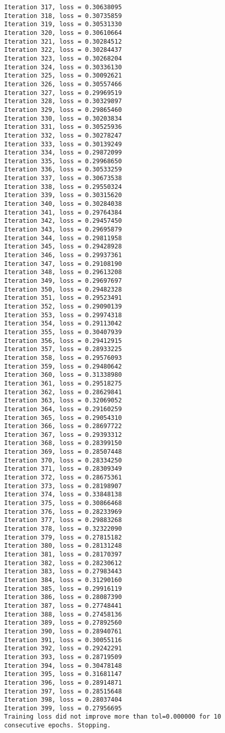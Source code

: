 \documentclass[11pt]{article}
\begin{document}
\begin{Verbatim}[commandchars=\\\{\}]
Iteration 317, loss = 0.30638095
Iteration 318, loss = 0.30735859
Iteration 319, loss = 0.30531330
Iteration 320, loss = 0.30610664
Iteration 321, loss = 0.30284512
Iteration 322, loss = 0.30284437
Iteration 323, loss = 0.30268204
Iteration 324, loss = 0.30336130
Iteration 325, loss = 0.30092621
Iteration 326, loss = 0.30557466
Iteration 327, loss = 0.29969519
Iteration 328, loss = 0.30329897
Iteration 329, loss = 0.29865460
Iteration 330, loss = 0.30203834
Iteration 331, loss = 0.30525936
Iteration 332, loss = 0.30278247
Iteration 333, loss = 0.30139249
Iteration 334, loss = 0.29872099
Iteration 335, loss = 0.29968650
Iteration 336, loss = 0.30533259
Iteration 337, loss = 0.30673538
Iteration 338, loss = 0.29550324
Iteration 339, loss = 0.30315620
Iteration 340, loss = 0.30284038
Iteration 341, loss = 0.29764384
Iteration 342, loss = 0.29457450
Iteration 343, loss = 0.29695879
Iteration 344, loss = 0.29811958
Iteration 345, loss = 0.29428928
Iteration 346, loss = 0.29937361
Iteration 347, loss = 0.29108190
Iteration 348, loss = 0.29613208
Iteration 349, loss = 0.29697697
Iteration 350, loss = 0.29482328
Iteration 351, loss = 0.29523491
Iteration 352, loss = 0.29090139
Iteration 353, loss = 0.29974318
Iteration 354, loss = 0.29113042
Iteration 355, loss = 0.30407939
Iteration 356, loss = 0.29412915
Iteration 357, loss = 0.28933225
Iteration 358, loss = 0.29576093
Iteration 359, loss = 0.29480642
Iteration 360, loss = 0.31338980
Iteration 361, loss = 0.29518275
Iteration 362, loss = 0.28629841
Iteration 363, loss = 0.32069052
Iteration 364, loss = 0.29160259
Iteration 365, loss = 0.29054310
Iteration 366, loss = 0.28697722
Iteration 367, loss = 0.29393312
Iteration 368, loss = 0.28399150
Iteration 369, loss = 0.28507448
Iteration 370, loss = 0.28334250
Iteration 371, loss = 0.28309349
Iteration 372, loss = 0.28675361
Iteration 373, loss = 0.28198907
Iteration 374, loss = 0.33848138
Iteration 375, loss = 0.30866468
Iteration 376, loss = 0.28233969
Iteration 377, loss = 0.29883268
Iteration 378, loss = 0.32322090
Iteration 379, loss = 0.27815182
Iteration 380, loss = 0.28131248
Iteration 381, loss = 0.28170397
Iteration 382, loss = 0.28230612
Iteration 383, loss = 0.27983443
Iteration 384, loss = 0.31290160
Iteration 385, loss = 0.29916119
Iteration 386, loss = 0.28087390
Iteration 387, loss = 0.27748441
Iteration 388, loss = 0.27458136
Iteration 389, loss = 0.27892560
Iteration 390, loss = 0.28940761
Iteration 391, loss = 0.30055116
Iteration 392, loss = 0.29242291
Iteration 393, loss = 0.28719509
Iteration 394, loss = 0.30478148
Iteration 395, loss = 0.31681147
Iteration 396, loss = 0.28914871
Iteration 397, loss = 0.28515648
Iteration 398, loss = 0.28037404
Iteration 399, loss = 0.27956695
Training loss did not improve more than tol=0.000000 for 10 consecutive epochs. Stopping.

    \end{Verbatim}
\end{document}
